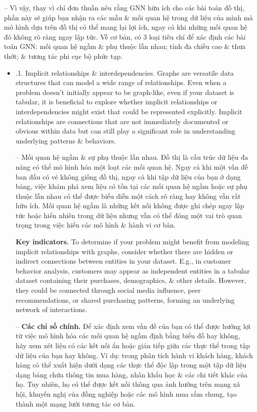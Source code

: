 \documentclass{article}
\begin{document}
\begin{itemize}
\begin{itemize}
        -- Vì vậy, thay vì chỉ đơn thuần nêu rằng GNN hữu ích cho các bài toán đồ thị, phần này sẽ giúp bạn nhận ra các mẫu \& mối quan hệ trong dữ liệu của mình mà mô hình dựa trên đồ thị có thể mang lại lợi ích, ngay cả khi những mối quan hệ đó không rõ ràng ngay lập tức. Về cơ bản, có 3 loại tiêu chí để xác định các bài toán GNN: mối quan hệ ngầm \& phụ thuộc lẫn nhau; tính đa chiều cao \& thưa thớt; \& tương tác phi cục bộ phức tạp.
        \begin{itemize}
            \item {.1. Implicit relationships \& interdependencies.} Graphs are versatile data structures that can model a wide range of relationships. Even when a problem doesn't initially appear to be graph-like, even if your dataset is tabular, it is beneficial to explore whether implicit relationships or interdependencies might exist that could be represented explicitly. Implicit relationships are connections that are not immediately documented or obvious within data but can still play a significant role in understanding underlying patterns \& behaviors.

            -- {\sf Mối quan hệ ngầm \& sự phụ thuộc lẫn nhau.} Đồ thị là cấu trúc dữ liệu đa năng có thể mô hình hóa một loạt các mối quan hệ. Ngay cả khi một vấn đề ban đầu có vẻ không giống đồ thị, ngay cả khi tập dữ liệu của bạn ở dạng bảng, việc khám phá xem liệu có tồn tại các mối quan hệ ngầm hoặc sự phụ thuộc lẫn nhau có thể được biểu diễn một cách rõ ràng hay không vẫn rất hữu ích. Mối quan hệ ngầm là những kết nối không được ghi chép ngay lập tức hoặc hiển nhiên trong dữ liệu nhưng vẫn có thể đóng một vai trò quan trọng trong việc hiểu các mô hình \& hành vi cơ bản.

            {\bf Key indicators.} To determine if your problem might benefit from modeling implicit relationships with graphs, consider whether there are hidden or indirect connections between entities in your dataset. E.g., in customer behavior analysis, customers may appear as independent entities in a tabular dataset containing their purchases, demographics, \& other details. However, they could be connected through social media influence, peer recommendations, or shared purchasing patterns, forming an underlying network of interactions.

            -- {\bf Các chỉ số chính.} Để xác định xem vấn đề của bạn có thể được hưởng lợi từ việc mô hình hóa các mối quan hệ ngầm định bằng biểu đồ hay không, hãy xem xét liệu có các kết nối ẩn hoặc gián tiếp giữa các thực thể trong tập dữ liệu của bạn hay không. Ví dụ: trong phân tích hành vi khách hàng, khách hàng có thể xuất hiện dưới dạng các thực thể độc lập trong một tập dữ liệu dạng bảng chứa thông tin mua hàng, nhân khẩu học \& các chi tiết khác của họ. Tuy nhiên, họ có thể được kết nối thông qua ảnh hưởng trên mạng xã hội, khuyến nghị của đồng nghiệp hoặc các mô hình mua sắm chung, tạo thành một mạng lưới tương tác cơ bản.


\end{itemize}
\end{itemize}
\end{itemize}
\end{document}
